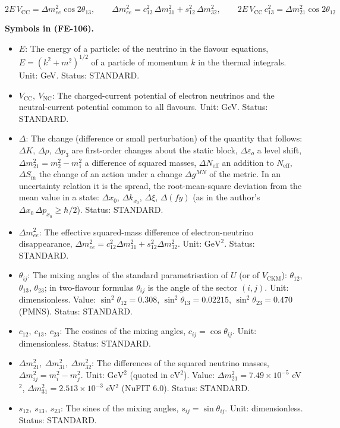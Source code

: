 \documentclass[
  10pt,
]{article}
\providecommand{\tightlist}{%
  \setlength{\itemsep}{0pt}\setlength{\parskip}{0pt}}
\begin{document}
\[
2E\,V_{\mathrm{CC}} = \Delta m_{ee}^2\cos2\theta_{13},\qquad \Delta m_{ee}^2 = c_{12}^2\,\Delta m_{31}^2
 + s_{12}^2\,\Delta m_{32}^2,
\qquad 2E\,V_{\mathrm{CC}}\,c_{13}^2 = \Delta m_{21}^2\cos2\theta_{12} \tag{FE-106}
\]

\textbf{Symbols in (FE-106).}

\begin{itemize}
\tightlist
\item
  \(E\): The energy of a particle: of the neutrino in the flavour
  equations, \(E = (k^2 + m^2)^{1/2}\) of a particle of momentum \(k\)
  in the thermal integrals. Unit: GeV. Status: STANDARD.
\item
  \(V_{\mathrm{CC}},\ V_{\mathrm{NC}}\): The charged-current potential
  of electron neutrinos and the neutral-current potential common to all
  flavours. Unit: GeV. Status: STANDARD.
\item
  \(\Delta\): The change (difference or small perturbation) of the
  quantity that follows: \(\Delta K\), \(\Delta\rho\), \(\Delta p_3\)
  are first-order changes about the static block,
  \(\Delta\varepsilon_o\) a level shift,
  \(\Delta m^2_{21} = m_2^2 - m_1^2\) a difference of squared masses,
  \(\Delta N_{\mathrm{eff}}\) an addition to \(N_{\mathrm{eff}}\),
  \(\Delta S_{\mathrm{m}}\) the change of an action under a change
  \(\Delta g^{MN}\) of the metric. In an uncertainty relation it is the
  spread, the root-mean-square deviation from the mean value in a state:
  \(\Delta x_0\), \(\Delta k_{x_0}\), \(\Delta\xi\), \(\Delta(fy)\) (as
  in the author's \(\Delta x_0\,\Delta p_{x_0} \ge \hbar/2\)). Status:
  STANDARD.
\item
  \(\Delta m_{ee}^2\): The effective squared-mass difference of
  electron-neutrino disappearance,
  \(\Delta m_{ee}^2 = c_{12}^2\Delta m_{31}^2 + s_{12}^2\Delta m_{32}^2\).
  Unit: \(\mathrm{GeV}^{2}\). Status: STANDARD.
\item
  \(\theta_{ij}\): The mixing angles of the standard parametrisation of
  \(U\) (or of \(V_{\mathrm{CKM}}\)): \(\theta_{12}\), \(\theta_{13}\),
  \(\theta_{23}\); in two-flavour formulas \(\theta_{ij}\) is the angle
  of the sector \((i, j)\). Unit: dimensionless. Value:
  \(\sin^2\theta_{12} = 0.308\), \(\sin^2\theta_{13} = 0.02215\),
  \(\sin^2\theta_{23} = 0.470\) (PMNS). Status: STANDARD.
\item
  \(c_{12},\ c_{13},\ c_{23}\): The cosines of the mixing angles,
  \(c_{ij} = \cos\theta_{ij}\). Unit: dimensionless. Status: STANDARD.
\item
  \(\Delta m_{21}^2,\ \Delta m_{31}^2,\ \Delta m_{32}^2\): The
  differences of the squared neutrino masses,
  \(\Delta m_{ij}^2 = m_i^2 - m_j^2\). Unit: \(\mathrm{GeV}^{2}\)
  (quoted in \(\mathrm{eV}^{2}\)). Value:
  \(\Delta m_{21}^2 = 7.49\times10^{-5}\) eV\(^2\),
  \(\Delta m_{31}^2 = 2.513\times10^{-3}\) eV\(^2\) (NuFIT 6.0). Status:
  STANDARD.
\item
  \(s_{12},\ s_{13},\ s_{23}\): The sines of the mixing angles,
  \(s_{ij} = \sin\theta_{ij}\). Unit: dimensionless. Status: STANDARD.
\end{itemize}
\end{document}
